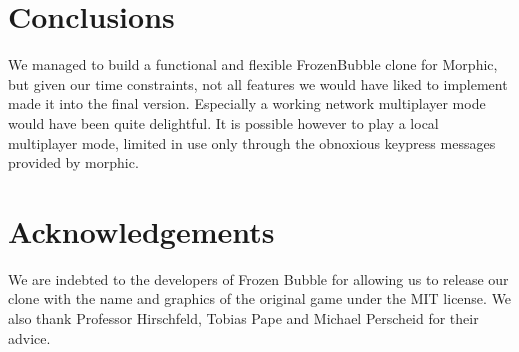 \section{Conclusions}
We managed to build a functional and flexible FrozenBubble clone for Morphic,
but given our time constraints, not all features we would have liked to implement
made it into the final version. Especially a working network multiplayer mode would
have been quite delightful. It is possible however to play a local multiplayer mode,
limited in use only through the obnoxious keypress messages provided by morphic.

\section*{Acknowledgements}
We are indebted to the developers of Frozen Bubble for allowing us to release 
our clone with the name and graphics of the original game under the MIT 
license. We also thank Professor Hirschfeld, Tobias Pape and Michael Perscheid for 
their advice.
